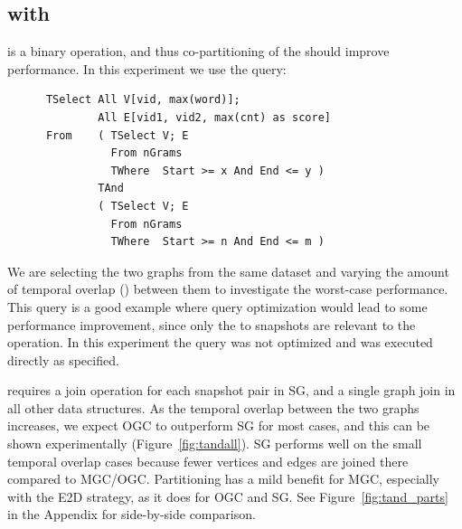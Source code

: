 \subsection{ with }

 is a binary operation, and thus co-partitioning of the
\tgs should improve performance.  In this experiment we use the query:

\begin{small}
\begin{verbatim}
      TSelect All V[vid, max(word)];
              All E[vid1, vid2, max(cnt) as score]
      From    ( TSelect V; E
                From nGrams
                TWhere  Start >= x And End <= y )
              TAnd
              ( TSelect V; E
                From nGrams
                TWhere  Start >= n And End <= m )      
\end{verbatim}
\end{small}

We are selecting the two graphs from the same dataset and varying the
amount of temporal overlap () between them to investigate
the worst-case performance.  This query is a good example where query
optimization would lead to some performance improvement, since only
the  to  snapshots are relevant to the operation.
In this experiment the query was not optimized and was executed
directly as specified.

 requires a join operation for each snapshot pair in SG,
and a single graph join in all other data structures.  As the temporal
overlap between the two graphs increases, we expect OGC to outperform
SG for most cases, and this can be shown experimentally
(Figure~\ref{fig:tandall}).  SG performs well on the small temporal
overlap cases because fewer vertices and edges are joined there
compared to MGC/OGC.  Partitioning has a mild benefit for MGC,
especially with the E2D strategy, as it does for OGC and SG. See
Figure~\ref{fig:tand_parts} in the Appendix for side-by-side
comparison.


